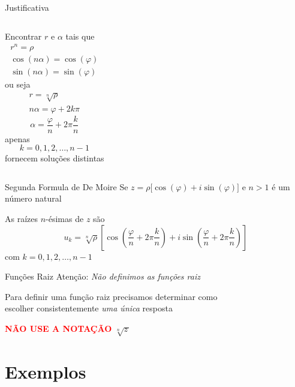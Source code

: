 \documentclass[fleqn,utf8,aspectratio=169,12pt]{beamer}
\begin{document}
\begin{proofframe}{Justificativa}
\begin{columns}
  Encontrar $r$ e $\alpha$
  \pause
   tais que
  \begin{gather*}
    r^n = \rho \\
    \cos(n\alpha) = \cos(\varphi) \\
    \sin(n\alpha) = \sin(\varphi)
  \end{gather*}
  \pause
  ou seja
  \begin{gather*}
    r = \sqrt[n]{\rho} \\
    n\alpha = \varphi + 2k\pi
  \end{gather*}
  \pause
  \[
    \alpha = \frac{\varphi}{n} + 2\pi\frac{k}{n}
  \]
  \pause
  apenas
  \[
    k = 0, 1, 2, \dots, n-1
  \]
  fornecem soluções distintas
\end{columns}
\end{proofframe}

\begin{frame}{Segunda Formula de De Moire}
  Se
  \(
    z = \rho \big[\cos(\varphi) + i\sin(\varphi)\big]
  \)
  e $n>1$ é um número natural

  \vspace{\baselineskip}
  As raízes $n$-ésimas de $z$ são
  \[
    u_k = \sqrt[n]{\rho}
    \left[
         \cos\left(\frac{\varphi}{n}+2\pi\frac{k}{n}\right)
      + i\sin\left(\frac{\varphi}{n}+2\pi\frac{k}{n}\right)
    \right]
  \]
  com \(k=0, 1, 2, \dots, n-1\)
\end{frame}


\begin{warningframe}{Funções Raiz}
  Atenção: \emph{Não definimos as funções raiz}

  \pause
  \bigskip
  Para definir uma função raiz precisamos determinar como \\
  escolher consistentemente \emph{uma única} resposta

  \pause
  \bigskip
  \textbf{\textcolor{red}{NÃO USE A NOTAÇÃO} }
  \Large \;
  \(
    \sqrt[n]{z\,}
  \)
\end{warningframe}


\section{Exemplos}
\end{document}
